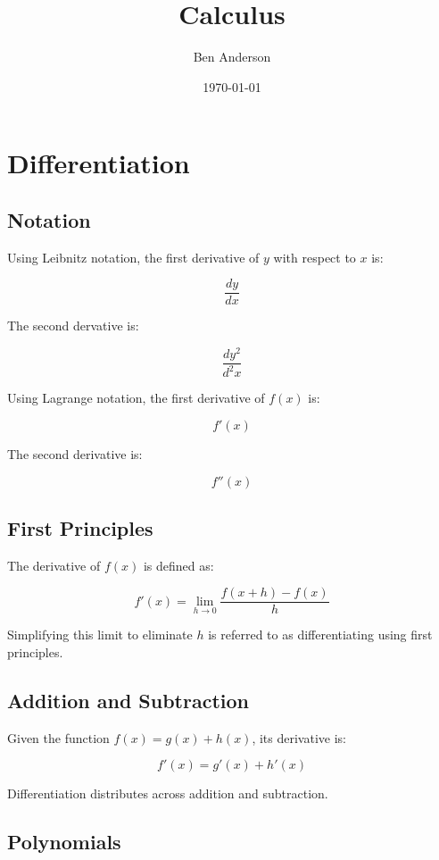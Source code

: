 \documentclass[a4paper,11pt]{article}
\begin{document}
\title{Calculus}
\author{Ben Anderson}
\date{\today}
\maketitle
\pagebreak

\tableofcontents
\pagebreak


\section{Differentiation}

\subsection{Notation}

Using Leibnitz notation, the first derivative of $y$ with respect to $x$ is:

$$
\frac{dy}{dx}
$$

The second dervative is:

$$
\frac{dy^2}{d^2x}
$$

Using Lagrange notation, the first derivative of $f(x)$ is:

$$
f'(x)
$$

The second derivative is:

$$
f''(x)
$$


\subsection{First Principles}

The derivative of $f(x)$ is defined as:

$$
f'(x) = \lim_{h \to 0} \frac{f(x + h) - f(x)}{h}
$$

Simplifying this limit to eliminate $h$ is referred to as differentiating using
first principles.


\subsection{Addition and Subtraction}

Given the function $f(x) = g(x) + h(x)$, its derivative is:

$$
f'(x) = g'(x) + h'(x)
$$

Differentiation distributes across addition and subtraction.


\subsection{Polynomials}
\end{document}
